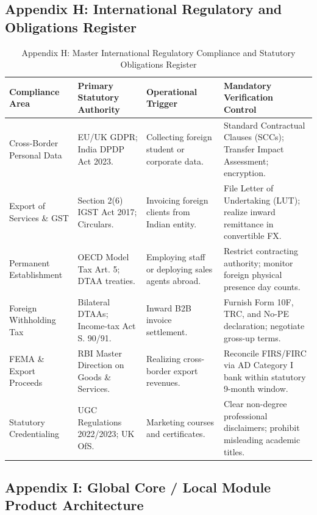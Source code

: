 \subsection{Appendix H: International Regulatory and Obligations Register}

\begin{table}[t]
\centering
\small
\caption{Appendix H: Master International Regulatory Compliance and Statutory Obligations Register}
\label{tab:app_reg_register}
\begin{tabularx}{\textwidth}{p{3.2cm} p{2.8cm} p{3.2cm} X}
\toprule
\textbf{Compliance Area} & \textbf{Primary Statutory Authority} & \textbf{Operational Trigger} & \textbf{Mandatory Verification Control} \\
\midrule
Cross-Border Personal Data & EU/UK GDPR; India DPDP Act 2023. & Collecting foreign student or corporate data. & Standard Contractual Clauses (SCCs); Transfer Impact Assessment; encryption. \\
Export of Services \& GST & Section 2(6) IGST Act 2017; Circulars. & Invoicing foreign clients from Indian entity. & File Letter of Undertaking (LUT); realize inward remittance in convertible FX. \\
Permanent Establishment & OECD Model Tax Art. 5; DTAA treaties. & Employing staff or deploying sales agents abroad. & Restrict contracting authority; monitor foreign physical presence day counts. \\
Foreign Withholding Tax & Bilateral DTAAs; Income-tax Act S. 90/91. & Inward B2B invoice settlement. & Furnish Form 10F, TRC, and No-PE declaration; negotiate gross-up terms. \\
FEMA \& Export Proceeds & RBI Master Direction on Goods \& Services. & Realizing cross-border export revenues. & Reconcile FIRS/FIRC via AD Category I bank within statutory 9-month window. \\
Statutory Credentialing & UGC Regulations 2022/2023; UK OfS. & Marketing courses and certificates. & Clear non-degree professional disclaimers; prohibit misleading academic titles. \\
\bottomrule
\end{tabularx}
\end{table}

\subsection{Appendix I: Global Core / Local Module Product Architecture}

